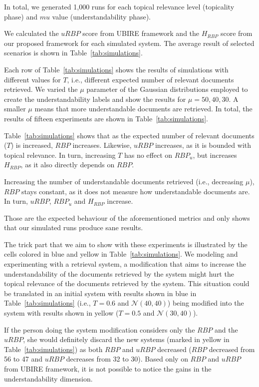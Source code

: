 In total, we generated 1,000 runs for each topical relevance level (topicality phase) and $mu$ value (understandability phase). 

We calculated the $uRBP$ score from UBIRE framework and the $H_{RBP}$ score from our proposed framework for each simulated system.
The average result of selected scenarios is shown in Table~\ref{tab:simulations}.

Each row of Table~\ref{tab:simulations} shows the results of simulations with different values for $T$, i.e., different expected number of relevant documents retrieved.
We varied the $\mu$ parameter of the Gaussian distributions employed to create the understandability labels and show the results for $\mu = 50, 40, 30$.
A smaller $\mu$ means that more understandable documents are retrieved.
In total, the results of fifteen experiments are shown in Table~\ref{tab:simulations}.

Table~\ref{tab:simulations} shows that as the expected number of relevant documents ($T$) is increased, $RBP$ increases.
Likewise, $uRBP$ increases, as it is bounded with topical relevance.
In turn, increasing $T$ has no effect on $RBP_u$, but increases $H_{RBP}$, as it also directly depends on $RBP$.

Increasing the number of understandable documents retrieved (i.e., decreasing $\mu$), $RBP$ stays constant, as it does not measure how understandable documents are.
In turn, $uRBP$, $RBP_u$ and $H_{RBP}$ increase.

Those are the expected behaviour of the aforementioned metrics and only shows that our simulated runs produce sane results.

The trick part that we aim to show with these experiments is illustrated by the cells colored in blue and yellow in Table~\ref{tab:simulations}.
We modeling and experimenting with a retrieval system, a modification that aims to increase the understandability of the documents retrieved by the system might hurt the topical relevance of the documents retrieved by the system.
This situation could be translated in an initial system with results shown in blue in Table~\ref{tab:simulations} (i.e., $T=0.6$ and $\mathcal{N}(40,40)$) 
being modified into the system with results shown in yellow ($T=0.5$ and $\mathcal{N}(30,40)$).

If the person doing the system modification considers only the $RBP$ and the $uRBP$, she would definitely discard the new systems (marked in yellow in Table~\ref{tab:simulations}) as both $RBP$ and $uRBP$ decreased ($RBP$ decreased from 56 to 47 and $uRBP$ decreases from 32 to 30). Based only on $RBP$ and $uRBP$ from UBIRE framework, it is not possible to notice the gains in the understandability dimension.

